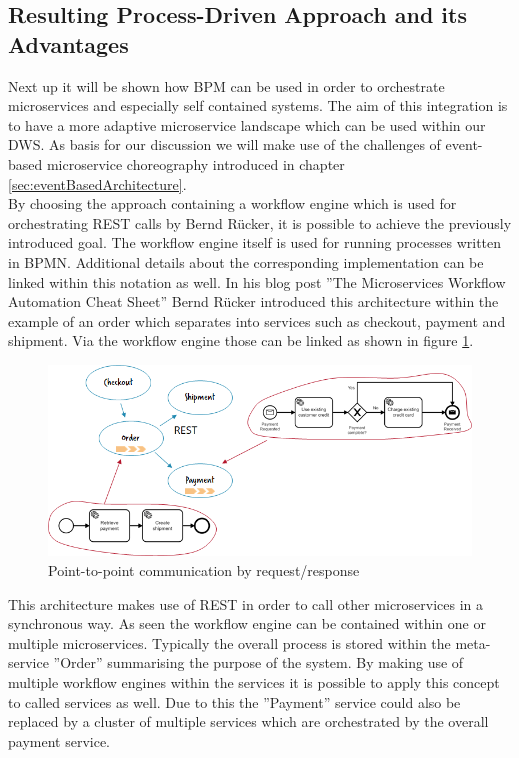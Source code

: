 \subsection{Resulting Process-Driven Approach and its Advantages}
Next up it will be shown how BPM can be used in order to orchestrate microservices and especially self contained systems. The aim of this integration is to have a more adaptive microservice landscape which can be used within our DWS. As basis for our discussion we will make use of the challenges of event-based microservice choreography introduced in chapter \ref{sec:eventBasedArchitecture}.\newline
\\
By choosing the approach containing a workflow engine which is used for orchestrating REST calls by Bernd Rücker, it is possible to achieve the previously introduced goal. The workflow engine itself is used for running processes written in BPMN. Additional details about the corresponding implementation can be linked within this notation as well.\newline
In his blog post ''The Microservices Workflow Automation Cheat Sheet'' Bernd Rücker introduced this architecture within the example of an order which separates into services such as checkout, payment and shipment. Via the workflow engine those can be linked as shown in figure \ref{fig:RestArchitecture}. \cite{orchestrationMicroServices}\newline
\begin{figure}[!htb]
    \centering
    \includegraphics[scale=0.65]{pictures/RestArchitecture.png}
    \caption{Point-to-point communication by request/response \cite{orchestrationMicroServices}}
    \label{fig:RestArchitecture}
\end{figure}
This architecture makes use of REST in order to call other microservices in a synchronous way. As seen the workflow engine can be contained within one or multiple microservices. \cite{orchestrationMicroServices} Typically the overall process is stored within the meta-service ''Order'' summarising the purpose of the system. By making use of multiple workflow engines within the services it is possible to apply this concept to called services as well. Due to this the ''Payment'' service could also be replaced by a cluster of multiple services which are orchestrated by the overall payment service.\newline
